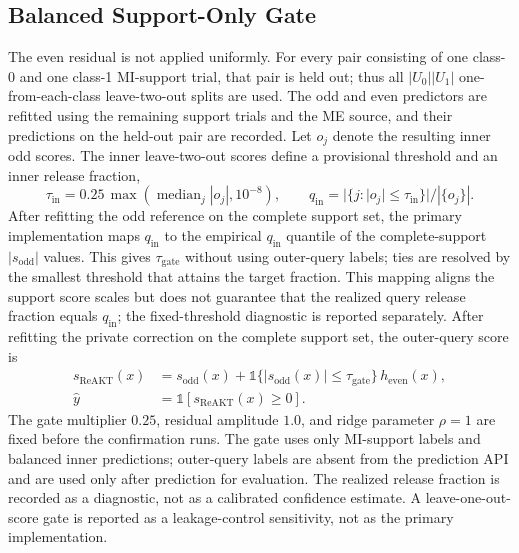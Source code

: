 \documentclass[preprint,12pt]{elsarticle}
\begin{document}
\subsection{Balanced Support-Only Gate}
The even residual is not applied uniformly. For every pair consisting of one
class-0 and one class-1 MI-support trial, that pair is held out; thus all
$|U_0||U_1|$ one-from-each-class leave-two-out splits are used. The odd and
even predictors are refitted using the remaining support trials and the ME
source, and their predictions on the held-out pair are recorded. Let $o_j$
denote the resulting inner odd scores. The inner leave-two-out scores define a provisional threshold and an inner release fraction,
\begin{equation}
\tau_{\mathrm{in}}=0.25\,\max\left(\operatorname{median}_j |o_j|,10^{-8}\right),\qquad
q_{\mathrm{in}}=|\{j:|o_j|\leq\tau_{\mathrm{in}}\}|/|\{o_j\}|.
\end{equation}
After refitting the odd reference on the complete support set, the primary implementation maps
$q_{\mathrm{in}}$ to the empirical $q_{\mathrm{in}}$ quantile of the complete-support
$|s_{\mathrm{odd}}|$ values. This gives $\tau_{\mathrm{gate}}$ without using outer-query labels;
ties are resolved by the smallest threshold that attains the target fraction. This mapping aligns the
support score scales but does not guarantee that the realized query release fraction equals
$q_{\mathrm{in}}$; the fixed-threshold diagnostic is reported separately. After refitting the
private correction on the complete support set, the outer-query score is
\begin{equation}
\begin{aligned}
s_{\mathrm{ReAKT}}(x)&=s_{\mathrm{odd}}(x)+
\mathbb{1}\{|s_{\mathrm{odd}}(x)|\leq\tau_{\mathrm{gate}}\}\,
h_{\mathrm{even}}(x),\\
\widehat y&=\mathbb{1}[s_{\mathrm{ReAKT}}(x)\geq0].
\end{aligned}
\end{equation}
The gate multiplier $0.25$, residual amplitude $1.0$, and ridge parameter $\rho=1$ are fixed before the confirmation runs. The gate uses only MI-support labels and balanced inner predictions; outer-query labels are absent from the prediction API and are used only after prediction for evaluation. The realized release fraction is recorded as a diagnostic, not as a calibrated confidence estimate. A leave-one-out-score gate is reported as a leakage-control sensitivity, not as the primary implementation.
\end{document}
